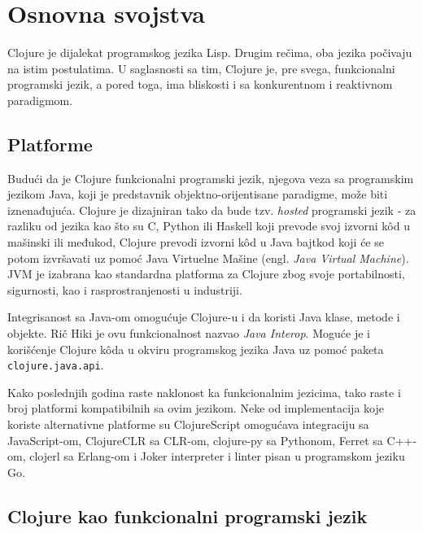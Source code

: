 \section{Osnovna svojstva}
\label{sec:osnovnasvojstva}

Clojure je dijalekat programskog jezika Lisp. Drugim rečima, oba jezika počivaju na istim postulatima. U saglasnosti sa tim, Clojure je, pre svega, funkcionalni programski jezik, a pored toga, ima bliskosti i sa konkurentnom i reaktivnom paradigmom\cite{clojure}.

\subsection{Platforme}
\label{subsec:platforme}

Budući da je Clojure funkcionalni programski jezik, njegova veza sa programskim jezikom Java, koji je predstavnik objektno-orijentisane paradigme, može biti iznenađujuća. Clojure je dizajniran tako da bude tzv. \textit{hosted} programski jezik - za razliku od jezika kao što su C, Python ili Haskell koji prevode svoj izvorni kôd u mašinski ili međukod, Clojure prevodi izvorni kôd u Java bajtkod koji će se potom izvršavati uz pomoć Java Virtuelne Mašine (engl. \textit{Java Virtual Machine}). JVM je izabrana kao standardna platforma za Clojure zbog svoje portabilnosti, sigurnosti, kao i rasprostranjenosti u industriji.


Integrisanost sa Java-om omogućuje Clojure-u i da koristi Java klase, metode i objekte. Rič Hiki je ovu funkcionalnost nazvao \emph{Java Interop}\cite{braveclojure}. Moguće je i korišćenje Clojure kôda u okviru programskog jezika Java uz pomoć paketa \texttt{clojure.java.api}.

Kako poslednjih godina raste naklonost ka funkcionalnim jezicima, tako raste i broj platformi kompatibilnih sa ovim jezikom. Neke od implementacija koje koriste alternativne platforme su ClojureScript \cite{clojure_script} omogućava integraciju sa JavaScript-om, ClojureCLR\cite{clojure_clr} sa CLR-om, clojure-py\cite{clojure_py} sa Pythonom, Ferret\cite{ferret} sa C++-om, clojerl\cite{clojerl} sa Erlang-om i Joker\cite{joker} interpreter i linter pisan u programskom jeziku Go.

\subsection{Clojure kao funkcionalni programski jezik}
\label{subsec:funkcionalni}


